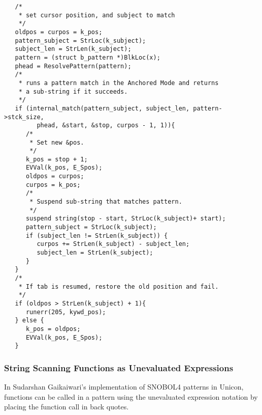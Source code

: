 \documentclass{article}
\begin{document}
\begin{verbatim}
   /*
    * set cursor position, and subject to match
    */
   oldpos = curpos = k_pos;
   pattern_subject = StrLoc(k_subject);
   subject_len = StrLen(k_subject);
   pattern = (struct b_pattern *)BlkLoc(x);
   phead = ResolvePattern(pattern);
   /*
    * runs a pattern match in the Anchored Mode and returns
    * a sub-string if it succeeds.
    */	
   if (internal_match(pattern_subject, subject_len, pattern->stck_size,
         phead, &start, &stop, curpos - 1, 1)){
      /*
       * Set new &pos.
       */ 
      k_pos = stop + 1;
      EVVal(k_pos, E_Spos);	
      oldpos = curpos;
      curpos = k_pos;
      /*
       * Suspend sub-string that matches pattern.
       */
      suspend string(stop - start, StrLoc(k_subject)+ start);
      pattern_subject = StrLoc(k_subject);
      if (subject_len != StrLen(k_subject)) {
         curpos += StrLen(k_subject) - subject_len;
         subject_len = StrLen(k_subject);
      }
   }
   /*
    * If tab is resumed, restore the old position and fail.
    */
   if (oldpos > StrLen(k_subject) + 1){
      runerr(205, kywd_pos);
   } else {
      k_pos = oldpos;
      EVVal(k_pos, E_Spos);
   }
\end{verbatim}

\subsubsection{String Scanning Functions as Unevaluated Expressions}
In Sudarshan Gaikaiwari's implementation of SNOBOL4 patterns in Unicon, functions can be called in a pattern using the unevaluated expression notation by placing the function call in back quotes.  
\end{document}
